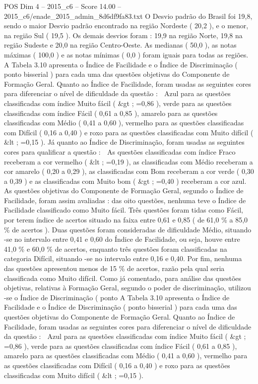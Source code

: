 \begin{textsample}{POS Dim 4 – 2015\_c6 – Score 14.00 – 2015\_c6/enade\_2015\_admin\_8d6df9fa83.txt}
O Desvio padrão do Brasil foi 19,8, sendo o maior Desvio padrão encontrado na região Nordeste ( 20,2 ), e o menor, na região Sul ( 19,5 ).
Os demais desvios foram : 19,9 na região Norte, 19,8 na região Sudeste e 20,0 na região Centro-Oeste.
As medianas ( 50,0 ), as notas máximas ( 100,0 ) e as notas mínimas ( 0,0 ) foram iguais para todas as regiões.
A Tabela 3.10 apresenta o Índice de Facilidade e o Índice de Discriminação ( ponto bisserial ) para cada uma das questões objetivas do Componente de Formação Geral.
Quanto ao Índice de Facilidade, foram usadas as seguintes cores para diferenciar o nível de dificuldade da questão :  Azul para as questões classificadas com índice Muito fácil ( \&gt ; =0,86 ), verde para as questões classificadas com índice Fácil ( 0,61 a 0,85 ), amarelo para as questões classificadas com Médio ( 0,41 a 0,60 ), vermelho para as questões classificadas com Difícil ( 0,16 a 0,40 ) e roxo para as questões classificadas com Muito difícil ( \&lt ; =0,15 ).
Já quanto ao Índice de Discriminação, foram usadas as seguintes cores para qualificar a questão :  As questões classificadas com índice Fraco receberam a cor vermelho ( \&lt ; =0,19 ), as classificadas com Médio receberam a cor amarelo ( 0,20 a 0,29 ), as classificadas com Bom receberam a cor verde ( 0,30 a 0,39 ) e as classificadas com Muito bom ( \&gt ; =0,40 ) receberam a cor azul.
As questões objetivas do Componente de Formação Geral, segundo o Índice de Facilidade, foram assim avaliadas : das oito questões, nenhuma teve o Índice de Facilidade classificado como Muito fácil.
Três questões foram tidas como Fácil, por terem índice de acertos situado na faixa entre 0,61 e 0,85 ( de 61,0 \% a 85,0 \% de acertos ).
Duas questões foram consideradas de dificuldade Médio, situando -se no intervalo entre 0,41 e 0,60 do Índice de Facilidade, ou seja, houve entre 41,0 \% e 60,0 \% de acertos, enquanto três questões foram classificadas na categoria Difícil, situando -se no intervalo entre 0,16 e 0,40.
Por fim, nenhuma das questões apresentou menos de 15 \% de acertos, razão pela qual seria classificada como Muito difícil.
Como já comentado, para análise das questões objetivas, relativas à Formação Geral, segundo o poder de discriminação, utilizou -se o Índice de Discriminação ( ponto A Tabela 3.10 apresenta o Índice de Facilidade e o Índice de Discriminação ( ponto bisserial ) para cada uma das questões objetivas do Componente de Formação Geral.
Quanto ao Índice de Facilidade, foram usadas as seguintes cores para diferenciar o nível de dificuldade da questão :  Azul para as questões classificadas com índice Muito fácil ( \&gt ; =0,86 ), verde para as questões classificadas com índice Fácil ( 0,61 a 0,85 ), amarelo para as questões classificadas com Médio ( 0,41 a 0,60 ), vermelho para as questões classificadas com Difícil ( 0,16 a 0,40 ) e roxo para as questões classificadas com Muito difícil ( \&lt ; =0,15 ).

\end{textsample}
